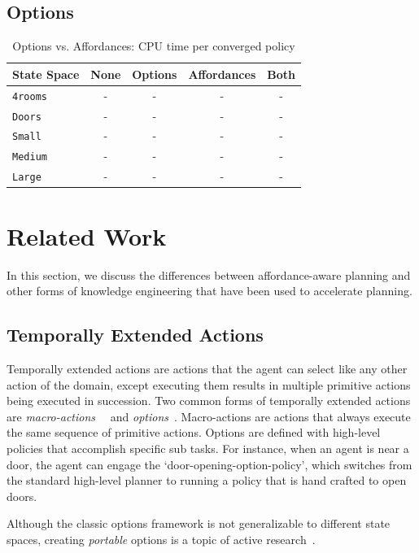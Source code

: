 \documentclass[conference]{IEEEtran}
\begin{document}
\subsection{Options}

\begin{table}[H]
\centering
\begin{tabular}{ l || c c c c }
  State Space 		& None & Options & Affordances & Both 	 	\\ \hline
  \texttt{4rooms}  	& 	-		&	-	&	-	&	-	\\
  \texttt{Doors}  		& 	-		&	-	&	-	&	-	\\
  \texttt{Small}  		& 	-		&	-	&	-	&	-	\\
  \texttt{Medium}  	& 	-		&	-	&	-	&	-	\\
  \texttt{Large}  		& 	-		&	-	&	-	&	-	\\
\end{tabular}
\caption{Options vs. Affordances: CPU time per converged policy}
\label{table:minecraft_results_cpu}
\end{table}


\section{Related Work}
\label{sec:related-work}

In this section, we discuss the differences between
affordance-aware planning and other forms of knowledge engineering that
have been used to accelerate planning.

\subsection{Temporally Extended Actions}
Temporally extended actions are actions that the agent can
select like any other action of the domain, except executing them
results in multiple primitive actions being executed in
succession. Two common forms of temporally extended actions are {\em
  macro-actions}~\cite{hauskrecht98} ~and {\em options}~\cite{sutton99}. 
Macro-actions are actions that always
execute the same sequence of primitive actions. Options are defined
with high-level policies that accomplish specific sub tasks. For
instance, when an agent is near a door, the agent can engage the
`door-opening-option-policy', which switches from the standard
high-level planner to running a policy that is hand crafted to open
doors. 

Although the classic options framework is not generalizable to different state spaces,
creating {\em portable} options is a topic of active research~\cite{konidaris07,konidaris2009efficient,Ravindran03analgebraic,croonenborghs2008learning,andre2002state,konidaris2012transfer}.
\end{document}
